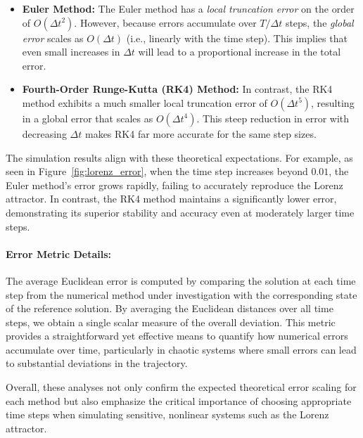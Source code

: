 \begin{itemize}
    \item \textbf{Euler Method:} The Euler method has a \emph{local truncation error} on the order of \(O(\Delta t^2)\). However, because errors accumulate over \(T/\Delta t\) steps, the \emph{global error} scales as \(O(\Delta t)\) (i.e., linearly with the time step). This implies that even small increases in \(\Delta t\) will lead to a proportional increase in the total error.
    \item \textbf{Fourth-Order Runge-Kutta (RK4) Method:} In contrast, the RK4 method exhibits a much smaller local truncation error of \(O(\Delta t^5)\), resulting in a global error that scales as \(O(\Delta t^4)\). This steep reduction in error with decreasing \(\Delta t\) makes RK4 far more accurate for the same step sizes.
\end{itemize}

The simulation results align with these theoretical expectations. For example, as seen in Figure~\ref{fig:lorenz_error}, when the time step increases beyond \(0.01\), the Euler method's error grows rapidly, failing to accurately reproduce the Lorenz attractor. In contrast, the RK4 method maintains a significantly lower error, demonstrating its superior stability and accuracy even at moderately larger time steps.

\paragraph{Error Metric Details:}
The average Euclidean error is computed by comparing the solution at each time step from the numerical method under investigation with the corresponding state of the reference solution. By averaging the Euclidean distances over all time steps, we obtain a single scalar measure of the overall deviation. This metric provides a straightforward yet effective means to quantify how numerical errors accumulate over time, particularly in chaotic systems where small errors can lead to substantial deviations in the trajectory.

Overall, these analyses not only confirm the expected theoretical error scaling for each method but also emphasize the critical importance of choosing appropriate time steps when simulating sensitive, nonlinear systems such as the Lorenz attractor.

% 
